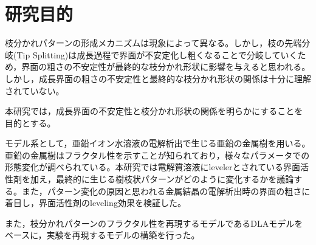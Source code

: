 \documentclass[autodetect-engine,dvi=dvipdfmx,a4paper,ja=standard]{bxjsbook}
\begin{document}

\thispagestyle{empty}

\restoregeometry
{}

\tableofcontents
{}






\section{研究目的}
枝分かれパターンの形成メカニズムは現象によって異なる。しかし，枝の先端分岐(Tip Splitting)は成長過程で界面が不安定化し粗くなることで分岐していくため，界面の粗さの不安定性が最終的な枝分かれ形状に影響を与えると思われる。しかし，成長界面の粗さの不安定性と最終的な枝分かれ形状の関係は十分に理解されていない。

本研究では，成長界面の不安定性と枝分かれ形状の関係を明らかにすることを目的とする。

モデル系として，亜鉛イオン水溶液の電解析出で生じる亜鉛の金属樹を用いる。亜鉛の金属樹はフラクタル性を示すことが知られており\cite{matsushita1984fractal}，様々なパラメータでの形態変化が調べられている\cite{suda2003temperature}。本研究では電解質溶液にlevelerとされている界面活性剤を加え，最終的に生じる樹枝状パターンがどのように変化するかを議論する。また，パターン変化の原因と思われる金属結晶の電解析出時の界面の粗さに着目し，界面活性剤のleveling効果を検証した。

また，枝分かれパターンのフラクタル性を再現するモデルであるDLAモデル\cite{witten1981diffusion}をベースに，実験を再現するモデルの構築を行った。




















\end{document}
